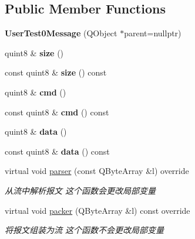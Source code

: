 \subsection*{Public Member Functions}
\begin{DoxyCompactItemize}
\item 
\mbox{\label{class_user_test0_message_a5ac3e9d0592c467c447a4df361222895}} 
{\bfseries User\+Test0\+Message} (Q\+Object $\ast$parent=nullptr)
\item 
\mbox{\label{class_user_test0_message_a50bf54dad8d158247baec708cc21f121}} 
quint8 \& {\bfseries size} ()
\item 
\mbox{\label{class_user_test0_message_a014779500a3e7b507a633af5626cf71e}} 
const quint8 \& {\bfseries size} () const
\item 
\mbox{\label{class_user_test0_message_aaf9297cc3b32374ed760dcf447ece440}} 
quint8 \& {\bfseries cmd} ()
\item 
\mbox{\label{class_user_test0_message_a3a9aae374b2c89d80dea1d4d23787be6}} 
const quint8 \& {\bfseries cmd} () const
\item 
\mbox{\label{class_user_test0_message_a7a075e62f940b96086dd2b30c78c9b0c}} 
quint8 \& {\bfseries data} ()
\item 
\mbox{\label{class_user_test0_message_ab9dd73390f15fd3e65707b2e0084ebc5}} 
const quint8 \& {\bfseries data} () const
\item 
virtual void \mbox{\hyperlink{class_user_test0_message_a9f00ff24d2ecec2d4b8a2cf2800921e1}{parser}} (const Q\+Byte\+Array \&l) override
\begin{DoxyCompactList}\small\item\em 从流中解析报文 这个函数会更改局部变量 \end{DoxyCompactList}\item 
virtual void \mbox{\hyperlink{class_user_test0_message_a0f9138c6d8f36a78e6b6606ef5312469}{packer}} (Q\+Byte\+Array \&l) const override
\begin{DoxyCompactList}\small\item\em 将报文组装为流 这个函数不会更改局部变量 \end{DoxyCompactList}\end{DoxyCompactItemize}



